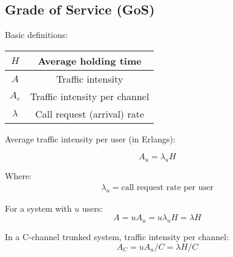 \subsection{Grade of Service (GoS)}
Basic definitions:

\begin{tabular}{| c | c |}
    \hline
    $H$ & Average holding time\\
    \hline
    $A$ & Traffic intensity\\
    \hline
    $A_c$ & Traffic intensity per channel\\
    \hline
    $\lambda$ & Call request (arrival) rate\\
    \hline    
\end{tabular}

Average traffic intensity per user (in Erlangs):
\begin{multicols*}{2}
    \begin{equation}
        A_u = \lambda_u H
    \end{equation}
    
    \columnbreak  
    Where:
    \begin{gather*}
        \lambda_u = \text{call request rate per user}
    \end{gather*}
\end{multicols*}

For a system with $u$ users:
\begin{equation}
    A = u A_u = u \lambda_u H = \lambda H
\end{equation}

In a C-channel trunked system, traffic intensity per channel:
\begin{equation}
    A_C = u A_u / C = \lambda H / C
\end{equation}